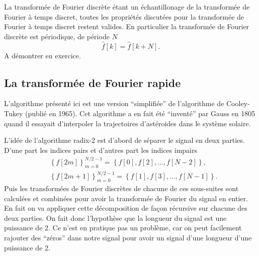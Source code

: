 \documentclass[a4paper,12pt]{book}
\newcommand{\fh}{\hat{f}}
\begin{document}
La transformée de Fourier discrète étant un échantillonage de la transformée de Fourier 
à temps discret, toutes les propriétés discutées pour la transformée de Fourier à temps
discret restent valides. En particulier la transformée de Fourier discrète est périodique, de période $N$
\begin{equation}
 \fh[k]=\fh[k+N].
\end{equation}
A démontrer en exercice.


\subsection{La transformée de Fourier rapide}\label{subsec_tfr}

L'algorithme présenté ici est une version ``simplifiée'' de l'algorithme de Cooley-Tukey
(publié en 1965). Cet algorithme a en fait été ``inventé'' par Gauss en 1805 
quand il essayait d'interpoler la trajectoires d'astéroides dans le système solaire.

L'idée de l'algorithme radix-2 est d'abord de séparer le signal en deux parties. D'une part
les indices pairs et d'autres part les indices impairs
\begin{align}
 &\left\{f[2m]\right\}_{m=0}^{N/2-1}=\left\{f[0],f[2],...,f[N-2]\right\},\\
 &\left\{f[2m+1]\right\}_{m=0}^{N/2-1}=\left\{f[1],f[3],...,f[N-1]\right\}.
\end{align}
Puis les transformées de Fourier discrètes de chacune de ces sous-suites sont calculées 
et combinées pour avoir la transformée de Fourier du signal en entier. En fait on va 
appliquer cette décomposition de façon récursive sur chacune des deux parties. On fait donc
l'hypothèse que la longueur du signal est une puissance de 2. Ce n'est en pratique pas un problème, car on peut facilement rajouter des ``zéros'' dans notre signal pour 
avoir un signal d'une longueur d'une puissance de 2.
\end{document}
